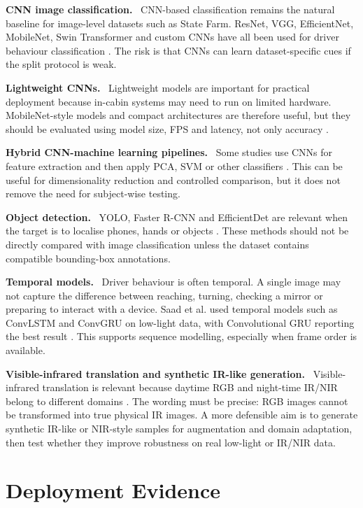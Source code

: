 \documentclass[11pt,a4paper]{article}
\let\oldsection\section
\renewcommand{\section}{\FloatBarrier\Needspace{9\baselineskip}\oldsection}
\newcommand{\focuspara}[1]{\par\medskip\noindent\textbf{#1.}\ }
\begin{document}
\focuspara{CNN image classification}
CNN-based classification remains the natural baseline for image-level datasets such as State Farm. ResNet, VGG, EfficientNet, MobileNet, Swin Transformer and custom CNNs have all been used for driver behaviour classification \parencite{huang2020,li2022,khan2023,zhang2024}. The risk is that CNNs can learn dataset-specific cues if the split protocol is weak.

\focuspara{Lightweight CNNs}
Lightweight models are important for practical deployment because in-cabin systems may need to run on limited hardware. MobileNet-style models and compact architectures are therefore useful, but they should be evaluated using model size, FPS and latency, not only accuracy \parencite{wu2024,wang2022}.

\focuspara{Hybrid CNN-machine learning pipelines}
Some studies use CNNs for feature extraction and then apply PCA, SVM or other classifiers \parencite{revathi2025,alkinani2022}. This can be useful for dimensionality reduction and controlled comparison, but it does not remove the need for subject-wise testing.

\focuspara{Object detection}
YOLO, Faster R-CNN and EfficientDet are relevant when the target is to localise phones, hands or objects \parencite{sajid2021,kanimozhi2025,elshamy2024}. These methods should not be directly compared with image classification unless the dataset contains compatible bounding-box annotations.

\focuspara{Temporal models}
Driver behaviour is often temporal. A single image may not capture the difference between reaching, turning, checking a mirror or preparing to interact with a device. Saad et al. used temporal models such as ConvLSTM and ConvGRU on low-light data, with Convolutional GRU reporting the best result \parencite{saad2020lowlight}. This supports sequence modelling, especially when frame order is available.

\focuspara{Visible-infrared translation and synthetic IR-like generation}
Visible-infrared translation is relevant because daytime RGB and night-time IR/NIR belong to different domains \parencite{shen2023visible}. The wording must be precise: RGB images cannot be transformed into true physical IR images. A more defensible aim is to generate synthetic IR-like or NIR-style samples for augmentation and domain adaptation, then test whether they improve robustness on real low-light or IR/NIR data.

\section{Deployment Evidence}
\end{document}
